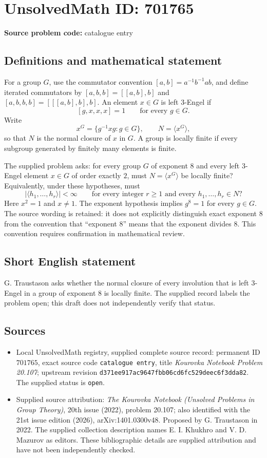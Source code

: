 \documentclass[11pt]{article}
\begin{document}
\section*{UnsolvedMath ID: 701765}
\textbf{Source problem code:} catalogue entry
\subsection{Definitions and mathematical statement}
For a group \(G\), use the commutator convention \([a,b]=a^{-1}b^{-1}ab\), and define iterated commutators by \([a,b,b]=[[a,b],b]\) and \([a,b,b,b]=[[[a,b],b],b]\). An element \(x\in G\) is left \(3\)-Engel if
\[
[g,x,x,x]=1\qquad\text{for every }g\in G.
\]
Write
\[
x^G=\{g^{-1}xg:g\in G\},\qquad N=\langle x^G\rangle,
\]
so that \(N\) is the normal closure of \(x\) in \(G\). A group is locally finite if every subgroup generated by finitely many elements is finite.

The supplied problem asks: for every group \(G\) of exponent \(8\) and every left \(3\)-Engel element \(x\in G\) of order exactly \(2\), must \(N=\langle x^G\rangle\) be locally finite? Equivalently, under these hypotheses, must
\[
\bigl|\langle h_1,\ldots,h_r\rangle\bigr|<\infty
\qquad\text{for every integer }r\geq1\text{ and every }h_1,\ldots,h_r\in N?
\]
Here \(x^2=1\) and \(x\ne1\). The exponent hypothesis implies \(g^8=1\) for every \(g\in G\). The source wording is retained: it does not explicitly distinguish exact exponent \(8\) from the convention that ``exponent \(8\)'' means that the exponent divides \(8\). This convention requires confirmation in mathematical review.
\subsection{Short English statement}
G. Traustason asks whether the normal closure of every involution that is left \(3\)-Engel in a group of exponent \(8\) is locally finite. The supplied record labels the problem open; this draft does not independently verify that status.
\subsection{Sources}
\begin{itemize}
\item Local UnsolvedMath registry, supplied complete source record: permanent ID \(701765\), exact source code \texttt{catalogue entry}, title \emph{Kourovka Notebook Problem 20.107}; upstream revision \texttt{d371ee917ac9647fbb06cd6fc529deec6f3dda82}. The supplied status is \texttt{open}.
\item Supplied source attribution: \emph{The Kourovka Notebook (Unsolved Problems in Group Theory)}, 20th issue (2022), problem 20.107; also identified with the 21st issue edition (2026), arXiv:1401.0300v48. Proposed by G. Traustason in 2022. The supplied collection description names E. I. Khukhro and V. D. Mazurov as editors. These bibliographic details are supplied attribution and have not been independently checked.
\end{itemize}
\end{document}
